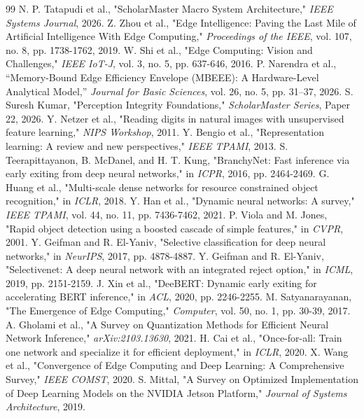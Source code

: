 \documentclass[conference]{IEEEtran}
\begin{document}
\begin{thebibliography}{99}
 N. P. Tatapudi et al., "ScholarMaster Macro System Architecture," \textit{IEEE Systems Journal}, 2026.
 Z. Zhou et al., "Edge Intelligence: Paving the Last Mile of Artificial Intelligence With Edge Computing," \textit{Proceedings of the IEEE}, vol. 107, no. 8, pp. 1738-1762, 2019.
 W. Shi et al., "Edge Computing: Vision and Challenges," \textit{IEEE IoT-J}, vol. 3, no. 5, pp. 637-646, 2016.
 P. Narendra et al., ``Memory-Bound Edge Efficiency Envelope (MBEEE): A Hardware-Level Analytical Model,'' \textit{Journal for Basic Sciences}, vol. 26, no. 5, pp. 31--37, 2026.
 S. Suresh Kumar, "Perception Integrity Foundations," \textit{ScholarMaster Series}, Paper 22, 2026.
 Y. Netzer et al., "Reading digits in natural images with unsupervised feature learning," \textit{NIPS Workshop}, 2011.
 Y. Bengio et al., "Representation learning: A review and new perspectives," \textit{IEEE TPAMI}, 2013.
 S. Teerapittayanon, B. McDanel, and H. T. Kung, "BranchyNet: Fast inference via early exiting from deep neural networks," in \textit{ICPR}, 2016, pp. 2464-2469.
 G. Huang et al., "Multi-scale dense networks for resource constrained object recognition," in \textit{ICLR}, 2018.
 Y. Han et al., "Dynamic neural networks: A survey," \textit{IEEE TPAMI}, vol. 44, no. 11, pp. 7436-7462, 2021.
 P. Viola and M. Jones, "Rapid object detection using a boosted cascade of simple features," in \textit{CVPR}, 2001.
 Y. Geifman and R. El-Yaniv, "Selective classification for deep neural networks," in \textit{NeurIPS}, 2017, pp. 4878-4887.
 Y. Geifman and R. El-Yaniv, "Selectivenet: A deep neural network with an integrated reject option," in \textit{ICML}, 2019, pp. 2151-2159.
 J. Xin et al., "DeeBERT: Dynamic early exiting for accelerating BERT inference," in \textit{ACL}, 2020, pp. 2246-2255.
 M. Satyanarayanan, "The Emergence of Edge Computing," \textit{Computer}, vol. 50, no. 1, pp. 30-39, 2017.
 A. Gholami et al., "A Survey on Quantization Methods for Efficient Neural Network Inference," \textit{arXiv:2103.13630}, 2021.
 H. Cai et al., "Once-for-all: Train one network and specialize it for efficient deployment," in \textit{ICLR}, 2020.
 X. Wang et al., "Convergence of Edge Computing and Deep Learning: A Comprehensive Survey," \textit{IEEE COMST}, 2020.
 S. Mittal, "A Survey on Optimized Implementation of Deep Learning Models on the NVIDIA Jetson Platform," \textit{Journal of Systems Architecture}, 2019.

\end{thebibliography}
\end{document}
